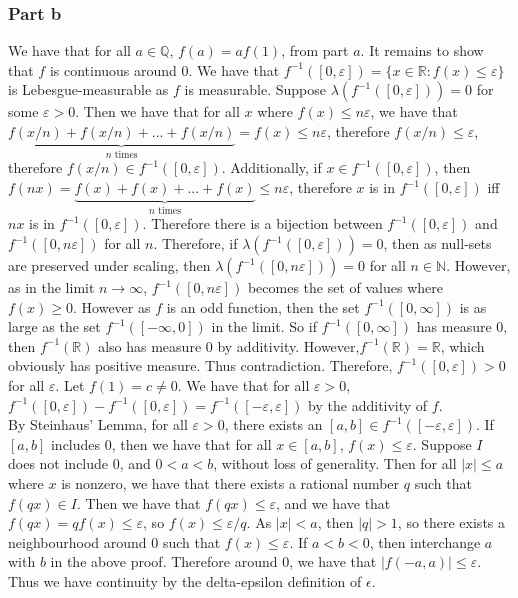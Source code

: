\documentclass{article}
\theoremstyle{definition}
\numberwithin{theorem}{section}
\numberwithin{equation}{section}
\begin{document}
\subsubsection{Part b}
We have that for all $a \in \mathbb{Q}$, $f(a) = a f(1)$, from part $a$. It remains to show that $f$ is continuous around $0$. We have that $f^{-1}([0, \varepsilon]) = \lbrace x \in \mathbb{R}: f(x) \leq \varepsilon \rbrace$ is Lebesgue-measurable as $f$ is measurable. Suppose $\lambda(f^{-1}([0, \varepsilon])) = 0$ for some $\varepsilon > 0$. Then we have that for all $x$ where $f(x) \leq n\varepsilon$, we have that $\underbrace{f(x/n) + f(x/n) + ... + f(x/n)}_{n \text{ times}} = f(x) \leq n \varepsilon$, therefore $f(x/n) \leq \varepsilon$, therefore $f(x/n) \in f^{-1}([0, \varepsilon]) $. Additionally, if $x \in f^{-1}([0, \varepsilon])$, then $f(n x) = \underbrace{f(x) + f(x) + ... + f(x)}_{n \text{ times}}\leq n \varepsilon$, therefore $x$ is in $f^{-1}([0, \varepsilon])$ iff $nx$ is in $f^{-1}([0, \varepsilon])$. Therefore there is a bijection between $f^{-1}([0, \varepsilon])$ and $f^{-1}([0, n\varepsilon])$ for all $n$. Therefore, if $\lambda(f^{-1}([0, \varepsilon])) = 0$, then as null-sets are preserved under scaling, then $\lambda(f^{-1}([0, n\varepsilon])) = 0$ for all $n \in \mathbb{N}$. However, as in the limit $n \rightarrow \infty$, $f^{-1}([0, n\varepsilon])$ becomes the set of values where $f(x) \geq 0$. However as $f$ is an odd function, then the set $f^{-1}([0, \infty])$ is as large as the set $f^{-1}([-\infty, 0])$ in the limit. So if $f^{-1}([0, \infty])$ has measure 0, then $f^{-1}(\mathbb{R})$ also has measure 0 by additivity. However,$f^{-1}(\mathbb{R}) = \mathbb{R}$, which obviously has positive measure. Thus contradiction. Therefore, $f^{-1}([0, \varepsilon]) > 0$ for all $\varepsilon$. Let $f(1) = c \neq 0$.
We have that for all $\varepsilon > 0$, $f^{-1}([0, \varepsilon]) - f^{-1}([0, \varepsilon]) = f^{-1}([-\varepsilon, \varepsilon])$ by the additivity of $f$.
\\
By Steinhaus' Lemma, for all $\varepsilon > 0$, there exists an $[a,b] \in f^{-1}([-\varepsilon, \varepsilon])$. If $[a,b]$ includes $0$, then we have that for all $x \in [a,b]$, $f(x) \leq \varepsilon$. Suppose $I$ does not include $0$, and $0 < a < b$, without loss of generality. Then for all $|x| \leq a$ where $x$ is nonzero, we have that there exists a rational number $q$ such that $f(qx) \in I$. Then we have that $f(qx) \leq \varepsilon$, and we have that $f(qx) = q f(x) \leq \varepsilon$, so $f(x) \leq \varepsilon/q$. As $|x| < a$, then $|q| > 1$, so there exists a neighbourhood around 0 such that $f(x) \leq \varepsilon$. If $a < b < 0$, then interchange $a$ with $b$ in the above proof. Therefore around 0, we have that $|f(-a, a)| \leq \varepsilon$. Thus we have continuity by the delta-epsilon definition of $\epsilon$. 
\end{document}
